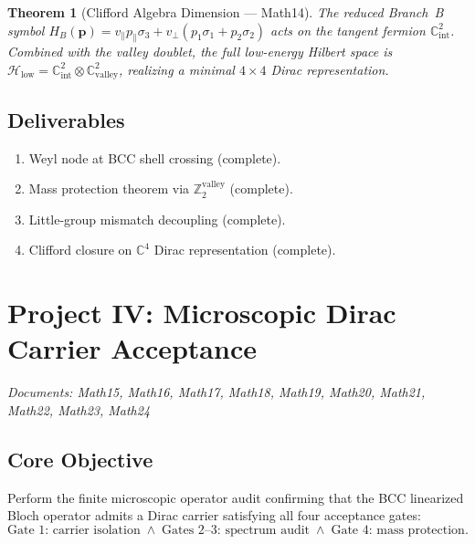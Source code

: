 \documentclass[reprint,aps,pre,onecolumn,superscriptaddress,amsmath,amssymb]{revtex4-2}
\newtheorem{theorem}{Theorem}[section]
\begin{document}
\begin{theorem}[Clifford Algebra Dimension --- Math14]
  \label{thm:Clifford}
  The reduced Branch~B symbol
  $H_{B}(\mathbf{p}) = v_{\parallel}p_{\parallel}\sigma_{3} + v_{\perp}(p_{1}\sigma_{1}+p_{2}\sigma_{2})$
  acts on the tangent fermion $\mathbb{C}^{2}_{\mathrm{int}}$.
  Combined with the valley doublet, the full low-energy Hilbert space is
  $\mathcal{H}_{\mathrm{low}} = \mathbb{C}^{2}_{\mathrm{int}} \otimes \mathbb{C}^{2}_{\mathrm{valley}}$,
  realizing a minimal $4\times 4$ Dirac representation.
\end{theorem}

\subsection{Deliverables}
\begin{enumerate}
  \item Weyl node at BCC shell crossing (complete).
  \item Mass protection theorem via $\mathbb{Z}_{2}^{\mathrm{valley}}$ (complete).
  \item Little-group mismatch decoupling (complete).
  \item Clifford closure on $\mathbb{C}^{4}$ Dirac representation (complete).
\end{enumerate}

\section{Project IV: Microscopic Dirac Carrier Acceptance}
\label{sec:proj4}
\textit{Documents: Math15, Math16, Math17, Math18, Math19, Math20, Math21, Math22, Math23, Math24}

\subsection{Core Objective}

Perform the finite microscopic operator audit confirming that the BCC linearized
Bloch operator admits a Dirac carrier satisfying all four acceptance gates:
\begin{equation}
  \boxed{
    \text{Gate 1: carrier isolation}
    \;\wedge\;
    \text{Gates 2--3: spectrum audit}
    \;\wedge\;
    \text{Gate 4: mass protection.}
  }
  \label{eq:gates}
\end{equation}
\end{document}
